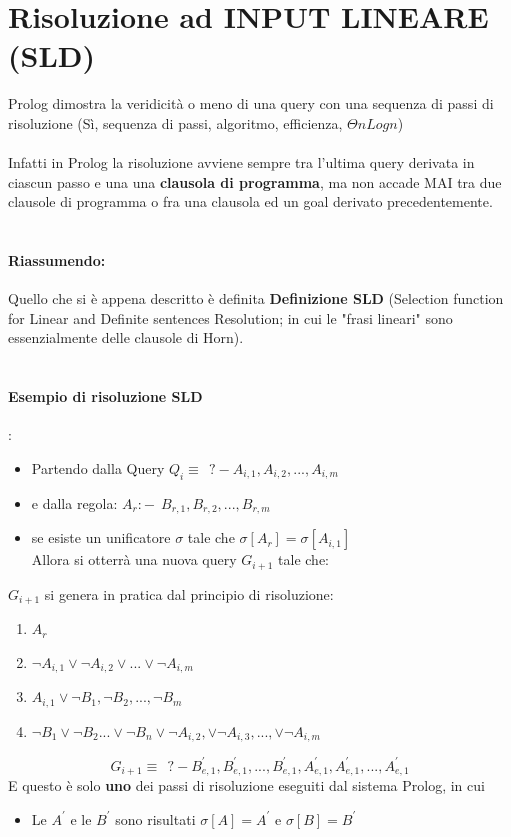 \documentclass[12pt, a4paper, openany, oneside]{book}
\begin{document}
\section{Risoluzione ad INPUT LINEARE (SLD)}
Prolog dimostra la veridicità o meno di una query con una sequenza di passi di
risoluzione (Sì, sequenza di passi, algoritmo, efficienza, $\Theta nLogn$) 
\\ \\
Infatti in Prolog la risoluzione avviene sempre tra l'ultima query derivata in 
ciascun passo e una una \textbf{clausola di programma}, ma non accade MAI tra
due clausole di programma o fra una clausola ed un goal derivato precedentemente.
\\ \\
\paragraph{Riassumendo: } Quello che si è appena descritto è definita \textbf{Definizione
SLD} (Selection function for Linear and Definite sentences Resolution; in cui
le "frasi lineari" sono essenzialmente delle clausole di Horn).
\\ \\
\paragraph{Esempio di risoluzione SLD}:
\begin{itemize}
	\item Partendo dalla Query $Q_{i} \equiv ~~ ?- A_{i,1}, A_{i,2}, ..., A_{i,m}$
	\item e dalla regola: $A_{r} :- ~~ B_{r,1}, B_{r,2}, ..., B_{r,m}$
	\item se esiste un unificatore $\sigma$ tale che $\sigma[A_{r}] = 
	\sigma[A_{i,1}]$ \\
	Allora si otterrà una nuova query $G_{i+1}$ tale che: 
\end{itemize}
$G_{i+1}$ si genera in pratica dal principio di risoluzione:
\begin{enumerate}
	\item $A_{r}$
	\item $\neg A_{i,1} \vee \neg A_{i,2}\vee ...\vee \neg A_{i,m}$ 
	\item $A_{i,1} \vee \neg B_{1}, \neg B_{2}, ..., \neg B_{m}$
	\item $\neg B_{1} \vee \neg B_{2} ... \vee \neg B_{n} \vee \neg A_{i,2},
	\vee \neg A_{i,3}, ..., \vee \neg A_{i,m}$
\end{enumerate}
\[G_{i+1} \equiv ~~ ?- B_{e,1}^{'}, B_{e,1}^{'}, ..., B_{e,1}^{'}, A_{e,1}^{'}, 
A_{e,1}^{'}, ..., A_{e,1}^{'} \]
E questo è solo \textbf{uno} dei passi di risoluzione eseguiti dal sistema Prolog,
in cui \begin{itemize}
\item Le $A^{'}$ e le $B^{'}$ sono risultati $\sigma[A] = A^{'}$ e 
$\sigma[B] = B^{'}$
\end{itemize}
\end{document}

